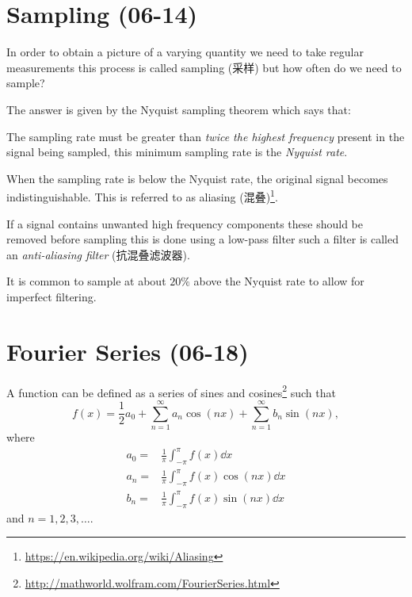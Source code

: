 \documentclass[a4paper,UTF8]{article}
\theoremstyle{mystyle}{
  \newtheorem{law}{Law}
}
\begin{document}
\section{Sampling (06-14)}
In order to obtain a picture of a varying quantity we need
to take regular measurements
this process is called sampling (采样)
but how often do we need to sample?

The answer is given by the Nyquist sampling theorem
which says that:
\begin{theorem}
The sampling rate must be greater than \emph{twice the
highest frequency} present in the signal being sampled,
this minimum sampling rate is the \emph{Nyquist rate}.
\end{theorem}


When the sampling rate is below the
Nyquist rate, the original signal
becomes indistinguishable. This is
referred to as aliasing (混叠)\footnote{\url{https://en.wikipedia.org/wiki/Aliasing}}.

If a signal contains unwanted high frequency components
these should be removed before sampling
this is done using a low-pass filter
such a filter is called an \emph{anti-aliasing filter} (抗混叠滤波器).

It is common to sample at about $20\%$ above the Nyquist rate
to allow for imperfect filtering.

\section{Fourier Series (06-18)}
A function can be defined as a series of sines and
cosines\footnote{\url{http://mathworld.wolfram.com/FourierSeries.html}} such that
\[
 f(x)=\frac{1}{2}a_0+\sum_{n=1}^\infty a_n \cos(nx)+\sum_{n=1}^\infty b_n \sin(nx), 
\]
where
\begin{align*}
a_0=& \frac{1}{\pi}\int_{-\pi}^{\pi}f(x)\dd{x}	\\
a_n=& \frac{1}{\pi}\int_{-\pi}^{\pi}f(x)\cos(nx)\dd{x}\\
b_n=& \frac{1}{\pi}\int_{-\pi}^{\pi}f(x)\sin(nx)\dd{x}
\end{align*}
and $n=1, 2, 3, \dots$.
\end{document}
